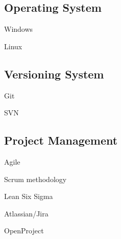 \documentclass[top=0.5in]{deedy-resume-openfont}
\begin{document}
\begin{minipage}[t]{0.33\textwidth}
\subsection{Operating System}
\vspace{\topsep}
\begin{tightemize}
    \item Windows
    \item Linux
\end{tightemize}
\sectionsep

\subsection{Versioning System}
\vspace{\topsep}
\begin{tightemize}
    \item Git
    \item SVN
\end{tightemize}
\sectionsep

\subsection{Project Management}
\vspace{\topsep}
\begin{tightemize}
    \item Agile
    \item Scrum methodology
    \item Lean Six Sigma
    \item Atlassian/Jira
    \item OpenProject
\end{tightemize}
\sectionsep

%
\sectionsep


\end{minipage}
\end{document}
